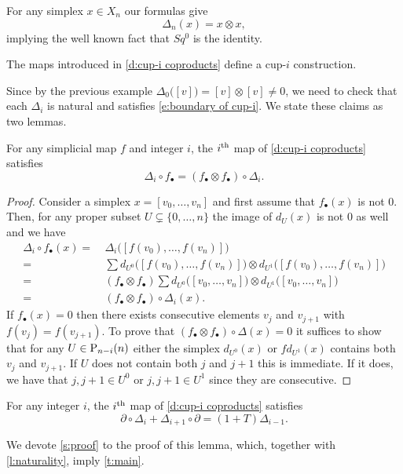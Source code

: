 \begin{example} \label{ex:Sq0 is the identity}
	For any simplex $x \in X_n$ our formulas give
	\begin{equation*}
	\Delta_n(x) = x \otimes x,
	\end{equation*}
	implying the well known fact that $Sq^0$ is the identity.
\end{example}

\begin{theorem} \label{t:main}
	The maps introduced in \cref{d:cup-i coproducts} define a cup-$i$ construction.
\end{theorem}

Since by the previous example $\Delta_0\big([v]\big) = [v] \otimes [v] \neq 0$, we need to check that each $\Delta_i$ is natural and satisfies \eqref{e:boundary of cup-i}.
We state these claims as two lemmas.

\begin{lemma} \label{l:naturality}
	For any simplicial map $f$ and integer $i$, the $i^\th$ map of \cref{d:cup-i coproducts} satisfies
	\begin{equation*}
	\Delta_i \circ f_\bullet = (f_\bullet \otimes f_\bullet) \circ \Delta_i.
	\end{equation*}
\end{lemma}

\begin{proof}
	Consider a simplex $x = [v_0, \dots, v_n]$ and first assume that $f_\bullet(x)$ is not $0$.
	Then, for any proper subset $U \subsetneq \{0, \dots, n\}$ the image of $d_U(x)$ is not $0$ as well and we have
	\begin{align*}
	\Delta_i \circ f_\bullet(x) =\ &
	\Delta_i \big([f(v_0), \dots, f(v_n)]\big) \\ =\ &
	\sum d_{U^0} \big([f(v_0), \dots, f(v_n)]\big) \otimes d_{U^1} \big([f(v_0), \dots, f(v_n)]\big) \\ =\ &
	(f_\bullet \otimes f_\bullet) \sum d_{U^0} \big([v_0, \dots, v_n]\big) \otimes d_{U^1} \big([v_0, \dots, v_n]\big) \\ =\ &
	(f_\bullet \otimes f_\bullet) \circ \Delta_i(x).
	\end{align*}
	If $f_\bullet(x) = 0$ then there exists consecutive elements $v_j$ and $v_{j+1}$ with $f(v_j) = f(v_{j+1})$.
	To prove that $(f_\bullet \otimes f_\bullet) \circ \Delta(x) = 0$ it suffices to show that for any $U \in \P_{n-i}(n)$ either the simplex $d_{U^0}(x)$ or $f d_{U^1}(x)$ contains both $v_j$ and $v_{j+1}$.
	If $U$ does not contain both $j$ and $j+1$ this is immediate.
	If it does, we have that $j, j+1 \in U^0$ or $j, j+1 \in U^1$ since they are consecutive.
\end{proof}

\begin{lemma} \label{l:main}
	For any integer $i$, the $i^\th$ map of \cref{d:cup-i coproducts} satisfies
	\begin{equation*}
	\partial \circ \Delta_{i} + \Delta_{i+1} \circ \partial = (1+T) \Delta_{i-1}.
	\end{equation*}
\end{lemma}

We devote \cref{s:proof} to the proof of this lemma, which, together with \cref{l:naturality}, imply \cref{t:main}.